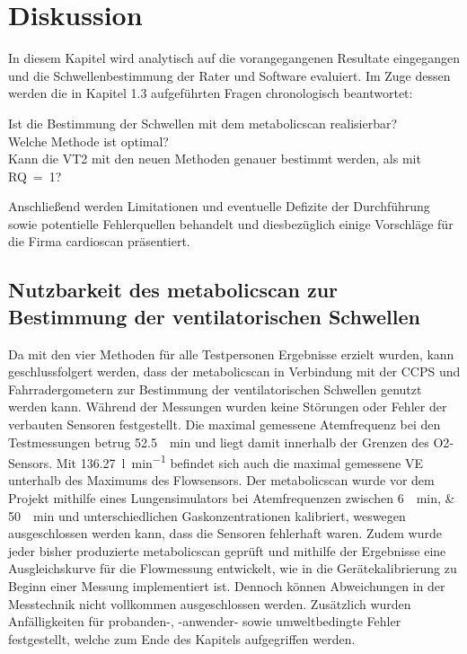 \chapter{Diskussion}

In diesem Kapitel wird analytisch auf die vorangegangenen Resultate eingegangen und die Schwellenbestimmung der Rater und Software evaluiert. Im Zuge dessen werden die in Kapitel 1.3 aufgeführten Fragen chronologisch beantwortet:
%
\begin{tabbing}
	Ist die Bestimmung der Schwellen mit dem metabolicscan realisierbar?\\
	Welche Methode ist optimal?\\
	Kann die VT2 mit den neuen Methoden genauer bestimmt werden, als mit RQ~=~1?
\end{tabbing}
%
Anschließend werden Limitationen und eventuelle Defizite der Durchführung sowie potentielle Fehlerquellen behandelt und diesbezüglich einige Vorschläge für die Firma cardioscan präsentiert.\\[1em]

\section{Nutzbarkeit des metabolicscan zur Bestimmung der ventilatorischen Schwellen}

Da mit den vier Methoden für alle Testpersonen Ergebnisse erzielt wurden, kann geschlussfolgert werden, dass der metabolicscan in Verbindung mit der \acs{CCPS} und Fahrradergometern zur Bestimmung der ventilatorischen Schwellen genutzt werden kann. Während der Messungen wurden keine Störungen oder Fehler der verbauten Sensoren festgestellt. Die maximal gemessene Atemfrequenz bei den Testmessungen betrug \SI{52,5}{\per\minute} und liegt damit innerhalb der Grenzen des \acs{O2}-Sensors. Mit \SI{136,27}{\litre\per\minute} befindet sich auch die maximal gemessene \acs{VE} unterhalb des Maximums des Flowsensors. Der metabolicscan wurde vor dem Projekt mithilfe eines Lungensimulators bei Atemfrequenzen zwischen \SIlist{6;50}{\per\minute} und unterschiedlichen Gaskonzentrationen kalibriert, weswegen ausgeschlossen werden kann, dass die Sensoren fehlerhaft waren. Zudem wurde jeder bisher produzierte metabolicscan geprüft und mithilfe der Ergebnisse eine Ausgleichskurve für die Flowmessung entwickelt, wie in die Gerätekalibrierung zu Beginn einer Messung implementiert ist. Dennoch können Abweichungen in der Messtechnik nicht vollkommen ausgeschlossen werden. Zusätzlich wurden Anfälligkeiten für probanden-, -anwender- sowie umweltbedingte Fehler festgestellt, welche zum Ende des Kapitels aufgegriffen werden.

